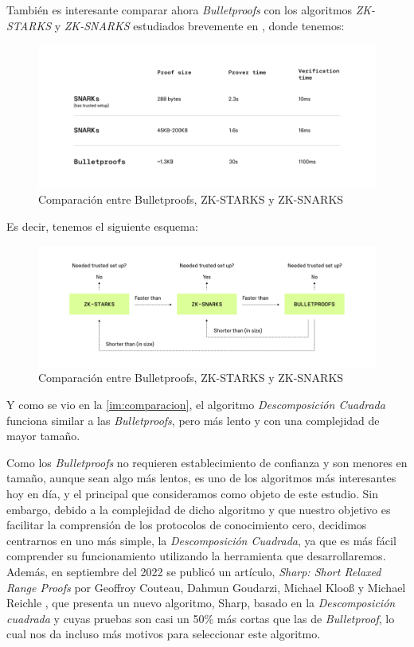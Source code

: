 También es interesante comparar ahora \emph{Bulletproofs} con los algoritmos \emph{ZK-STARKS} y \emph{ZK-SNARKS} estudiados brevemente en , donde tenemos:
\begin{figure}[H]
    \centering
    \includegraphics[width=\textwidth]{images/comparison2.png}
    \caption{Comparación entre Bulletproofs, ZK-STARKS y ZK-SNARKS \cite{Comparacion}}
\end{figure}

Es decir, tenemos el siguiente esquema:
\begin{figure}[H]
    \centering
    \includegraphics[width=\textwidth]{images/comparison.png}
    \caption{Comparación entre Bulletproofs, ZK-STARKS y ZK-SNARKS \cite{Comparacion}}
\end{figure}

Y como se vio en la \autoref{im:comparacion}, el algoritmo \emph{Descomposición Cuadrada} funciona similar a las \emph{Bulletproofs}, pero más lento y con una complejidad de mayor tamaño.

Como los \emph{Bulletproofs} no requieren establecimiento de confianza y son menores en tamaño, aunque sean algo más lentos, es uno de los algoritmos más interesantes hoy en día, y el principal que consideramos como objeto de este estudio. Sin embargo, debido a la complejidad de dicho algoritmo y que nuestro objetivo es facilitar la comprensión de los protocolos de conocimiento cero, decidimos centrarnos en uno más simple, la \emph{Descomposición Cuadrada}, ya que es más fácil comprender su funcionamiento utilizando la herramienta que desarrollaremos. Además, en septiembre del 2022 se publicó un artículo, \emph{Sharp: Short Relaxed Range Proofs} por Geoffroy Couteau, Dahmun Goudarzi, Michael Klooß y
Michael Reichle \cite{Sharp}, que presenta un nuevo algoritmo, Sharp, basado en la \emph{Descomposición cuadrada} y cuyas pruebas son casi un 50\% más cortas que las de \emph{Bulletproof}, lo cual nos da incluso más motivos para seleccionar este algoritmo.

